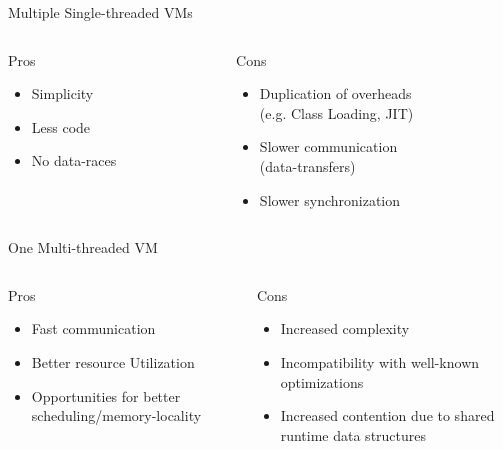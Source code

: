 \documentclass[
14pt,
aspectratio=169,
usenames,
dvipsnames,
x11names]{beamer}
\newcommand{\tik}[0]{{\color{YellowGreen}\Checkmark}} %
\newcommand{\ex}[0]{{\color{BrickRed}\XSolidBrush}}  %
\begin{document}
\begin{frame}{Multiple Single-threaded VMs}
  \begin{columns}[t]
    \begin{column}{.5\linewidth}
      Pros \tik
      \begin{itemize}  \setlength{\itemsep}{\fill}
      \item Simplicity
      \item Less code
      \item No data-races
      \end{itemize}
    \end{column}
    \begin{column}{.5\linewidth}
      Cons \ex
      \begin{itemize}  \setlength{\itemsep}{\fill}
      \item Duplication of overheads\\ (e.g. Class Loading, JIT)
      \item Slower communication\\ (data-transfers)
      \item Slower synchronization
      \end{itemize}
    \end{column}
  \end{columns}
\end{frame}

\begin{frame}{One Multi-threaded VM}
  \begin{columns}[t]
    \begin{column}{.5\linewidth}
      Pros \tik
      \begin{itemize}  \setlength{\itemsep}{\fill}
      \item Fast communication
      \item Better resource Utilization
      \item Opportunities for better scheduling/memory-locality
      \end{itemize}
    \end{column}
    \begin{column}{.5\linewidth}
      Cons \ex
      \begin{itemize}  \setlength{\itemsep}{\fill}
      \item Increased complexity
      \item Incompatibility with well-known optimizations
      \item Increased contention due to shared runtime data structures
      \end{itemize}
    \end{column}
  \end{columns}
\end{frame}
\end{document}
